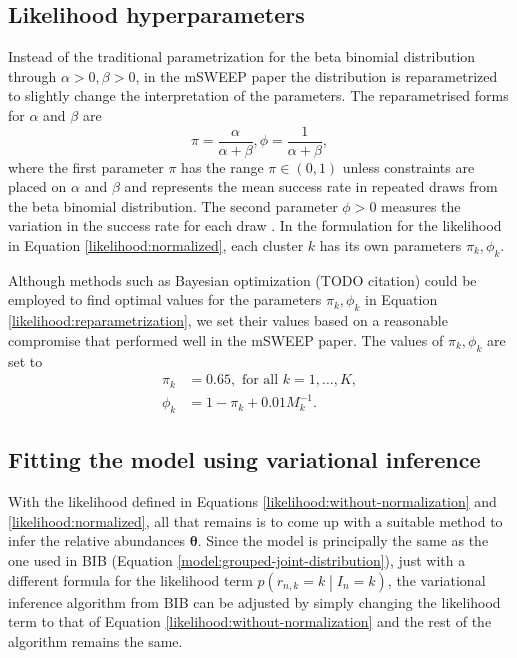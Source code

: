 \documentclass[officiallayout]{tktla}
\begin{document}
\subsection{Likelihood hyperparameters}

Instead of the traditional parametrization for the beta binomial
distribution through $\alpha >0, \beta > 0$, in the mSWEEP paper the
distribution is reparametrized to slightly change the interpretation
of the parameters. The reparametrised forms for $\alpha$ and $\beta$ are
\begin{equation}
  \label{likelihood:reparametrization}
  \pi = \frac{\alpha}{\alpha + \beta}, \phi = \frac{1}{\alpha + \beta},
\end{equation}
where the first parameter $\pi$ has the range $\pi \in \left(0,
1\right)$ unless constraints are placed on $\alpha$ and $\beta$ and
represents the mean success rate in repeated draws from the beta
binomial distribution. The second parameter $\phi > 0$ measures
the variation in the success rate for each draw
\citep{griffiths1973maximum}. In the formulation for the likelihood in
Equation \ref{likelihood:normalized}, each cluster $k$ has its own
parameters $\pi_{k}, \phi_{k}$.

Although methods such as Bayesian optimization (TODO citation) could
be employed to find optimal values for the parameters $\pi_{k},
\phi_{k}$ in Equation \ref{likelihood:reparametrization}, we set their
values based on a reasonable compromise that performed well in the
mSWEEP paper. The values of $\pi_{k}, \phi_{k}$ are set to
\begin{equation}
  \begin{aligned}
    \pi_k &= 0.65, \text{ for all } k = 1, \dots, K, \\
    \phi_{k} &= 1 - \pi_{k} + 0.01M_{k}^{-1}.
  \end{aligned}
\end{equation}

\subsection{Fitting the model using variational inference}

With the likelihood defined in Equations
\ref{likelihood:without-normalization} and
\ref{likelihood:normalized}, all that remains is to come up with a
suitable method to infer the relative abundances
$\boldsymbol\theta$. Since the model is principally the same as the
one used in BIB (Equation \ref{model:grouped-joint-distribution}),
just with a different formula for the likelihood term $p\left(r_{n, k}
= k \middle| I_{n} = k\right)$, the variational inference algorithm
from BIB can be adjusted by simply changing the likelihood term to
that of Equation \ref{likelihood:without-normalization} and the rest of
the algorithm remains the same.
\end{document}
